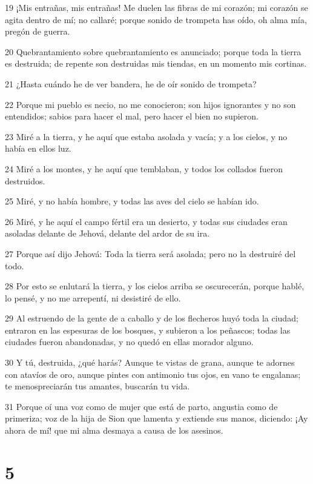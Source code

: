 \par 19 ¡Mis entrañas, mis entrañas! Me duelen las fibras de mi corazón; mi corazón se agita dentro de mí; no callaré; porque sonido de trompeta has oído, oh alma mía, pregón de guerra.
\par 20 Quebrantamiento sobre quebrantamiento es anunciado; porque toda la tierra es destruida; de repente son destruidas mis tiendas, en un momento mis cortinas.
\par 21 ¿Hasta cuándo he de ver bandera, he de oír sonido de trompeta?
\par 22 Porque mi pueblo es necio, no me conocieron; son hijos ignorantes y no son entendidos; sabios para hacer el mal, pero hacer el bien no supieron.
\par 23 Miré a la tierra, y he aquí que estaba asolada y vacía; y a los cielos, y no había en ellos luz.
\par 24 Miré a los montes, y he aquí que temblaban, y todos los collados fueron destruidos.
\par 25 Miré, y no había hombre, y todas las aves del cielo se habían ido.
\par 26 Miré, y he aquí el campo fértil era un desierto, y todas sus ciudades eran asoladas delante de Jehová, delante del ardor de su ira.
\par 27 Porque así dijo Jehová: Toda la tierra será asolada; pero no la destruiré del todo.
\par 28 Por esto se enlutará la tierra, y los cielos arriba se oscurecerán, porque hablé, lo pensé, y no me arrepentí, ni desistiré de ello.
\par 29 Al estruendo de la gente de a caballo y de los flecheros huyó toda la ciudad; entraron en las espesuras de los bosques, y subieron a los peñascos; todas las ciudades fueron abandonadas, y no quedó en ellas morador alguno.
\par 30 Y tú, destruida, ¿qué harás? Aunque te vistas de grana, aunque te adornes con atavíos de oro, aunque pintes con antimonio tus ojos, en vano te engalanas; te menospreciarán tus amantes, buscarán tu vida.
\par 31 Porque oí una voz como de mujer que está de parto, angustia como de primeriza; voz de la hija de Sion que lamenta y extiende sus manos, diciendo: ¡Ay ahora de mí! que mi alma desmaya a causa de los asesinos.

\chapter{5}

